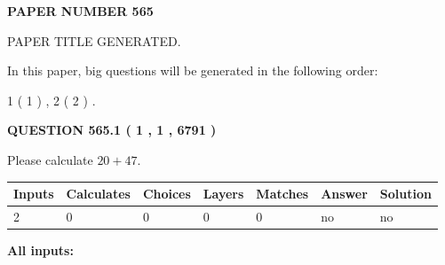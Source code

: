 \documentclass[12pt]{article}
\begin{document}
   
   
   
\newpage 
\setcounter{page}{ 
   565001 } 
   
   
   
   
 {\textbf{ \Large{ PAPER NUMBER  565  }}}
   
   
\vspace{0.2in}
   
   
   
   
   
   
   
   
 \vspace{0.2in}
 
 
 
 
   
   
 PAPER TITLE GENERATED.
   
   
   
\vspace{0.2in}
   
In this paper, big questions will be generated in the following order: 
   
   
   1 ( 1 )
 ,
   2 ( 2 )
 .
  
\vspace{0.2in}
  
{\textbf{\Large{QUESTION
565.1 
 ( 1 , 1 , 6791 )
}}}
  
  
 
Please calculate $ %
20 +  %
47 $.
 
 
   
   
   
   
\noindent\begin{tabular}{|l|l|l|l|l|l|l|}
 \hline
Inputs & Calculates & Choices & Layers & Matches & Answer & Solution \\ \hline
 2  & 
 0  & 
 0
  & 
 0  & 
 0  & 
  no & 
  no 
  \\ \hline
 \end{tabular}
   
   
   
   
\noindent{}
   
   
   
   
\noindent\vspace{0.1in}\hspace{-0.08in} {\textbf{\Large{All inputs: }}}
   
   
  
\end{document}
